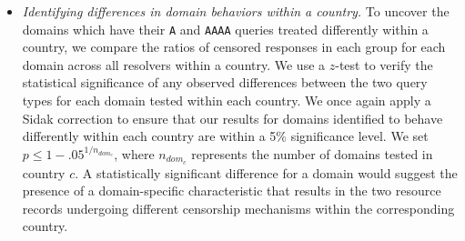 \begin{itemize}
  \item {\it Identifying differences in domain behaviors within a country.} To
    uncover the domains which have their {\tt A} and {\tt AAAA} queries treated
    differently within a country, we compare the ratios of censored responses
    in each group for each domain across all resolvers within a country. 
    We use a $z$-test to verify the statistical significance of any observed
    differences between the two query types for each domain tested within each
    country. We once again apply a Sidak correction to ensure that our
    results for domains identified to behave differently within each country
    are within a 5\% significance level. We set $p \leq
    1-{.05}^{1/n_{dom_{c}}}$, where $n_{dom_{c}}$ represents the number of
    domains tested in country $c$.
    A statistically significant difference for a domain would suggest
    the presence of a domain-specific characteristic that results in the two
    resource records undergoing different censorship mechanisms within the
    corresponding country.
\end{itemize}



